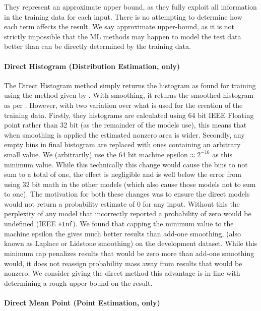 \documentclass[11pt,a4paper]{article}
\begin{document}
They represent an approximate upper bound, as they fully exploit all information in the training data for each input.
There is no attempting to determine how each term affects the result.
We say approximate upper-bound, as it is not strictly impossible that the ML methods may happen to model the test data better than can be directly determined by the training data.

\paragraph{Direct Histogram (Distribution Estimation, only)}\label{sec:direct-histogram}
The Direct Histogram method simply returns the histogram as found for training using the method given by .
With smoothing, it returns the smoothed histogram as per .
However, with two variation over what is used for the creation of the training data.
Firstly, they histograms are calculated using 64 bit IEEE Floating point rather than 32 bit (as the remainder of the models use), this means that when smoothing is applied the estimated nonzero area is wider.
Secondly, any empty bins in final histogram are replaced with ones containing an arbitrary small value.
We (arbitrarily) use the 64 bit machine epsilon$\approx 2^{-16}$ as this minimum value.
While this technically this change would cause the bins to not sum to a total of one, the effect is negligible and is well below the error from using 32 bit math in the other models (which also cause those models not to sum to one).
The motivation for both these changes was to ensure the direct models would not return a probability estimate of 0 for any input.
Without this the perplexity of any model that incorrectly reported a probability of zero would be undefined (IEEE \texttt{+Inf}).
We found that capping the minimum value to the machine epsilon the gives much better results than add-one smoothing, (also known as  Laplace or Lidstone smoothing) on the development dataset.
While this minimum cap penalizes results that would be zero more than add-one smoothing would, it does not reassign probability mass away from results that would be nonzero.
We consider giving the direct method this advantage is in-line with determining a rough upper bound on the result.

\paragraph{Direct Mean Point (Point Estimation, only)}
\end{document}
